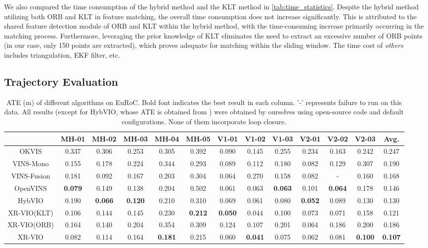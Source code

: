 We also compared the time consumption of the hybrid method and the KLT method in \cref{tab:time_statistics}. Despite the hybrid method utilizing both ORB and KLT in feature matching, the overall time consumption does not increase significantly. This is attributed to the shared feature detection module of ORB and KLT within the hybrid method, with the time-consuming increase primarily occurring in the matching process. Furthermore, leveraging the prior knowledge of KLT eliminates the need to extract an excessive number of ORB points (in our case, only 150 points are extracted), which proves adequate for matching within the sliding window. The time cost of \textit{others} includes triangulation, EKF filter, etc. 
\subsection{Trajectory Evaluation}
\begin{table*}[h]
    \caption{ATE (m)  of different algorithms on EuRoC.  Bold font indicates the best result in each column. '-' represents failure to run on this data. All results (except for HybVIO, whose ATE is obtained from \cite{hybvio}) were obtained by ourselves using open-source code and default configurations. None of them incorporate loop closure. }
    \centering
    \begin{tabular}{ccccccccccccc}
    \toprule
         & MH-01 & MH-02 & MH-03 & MH-04 & MH-05 & V1-01 & V1-02 & V1-03 & V2-01 & V2-02 & V2-03 & Avg. \\
         \midrule
         OKVIS      & 0.337 & 0.306 & 0.253 & 0.305 & 0.392 & 0.090 & 0.145 & 0.255 & 0.234 & 0.163 & 0.242 & 0.247 \\
         VINS-Mono  & 0.155 & 0.178 & 0.224 & 0.344 & 0.293 & 0.089 & 0.112 & 0.180 & 0.082 & 0.129 & 0.307 & 0.190 \\
         VINS-Fusion& 0.181 & 0.092 & 0.167 & 0.203 & 0.304 & 0.064 & 0.270 & 0.158 & 0.082 & -     & 0.160 & 0.168 \\
         OpenVINS   & \textbf{0.079} & 0.149 & 0.138 & 0.204 & 0.502 & 0.061 & 0.063 & \textbf{0.063} & 0.101 & \textbf{0.064} & 0.178 & 0.146 \\
         HybVIO     & 0.190 & \textbf{0.066} & \textbf{0.120} & 0.210 & 0.310 & 0.069 & 0.061 & 0.080 & \textbf{0.052} & 0.089 & 0.130 & 0.130 \\
         \midrule
         XR-VIO(KLT)& 0.106 & 0.144 & 0.145 & 0.230 & \textbf{0.212} & \textbf{0.050} & 0.044 & 0.100 & 0.073 & 0.071 & 0.158 & 0.121 \\
         XR-VIO(ORB)& 0.164 & 0.140 & 0.204 & 0.354 & 0.309 & 0.124 & 0.107 & 0.201 & 0.064 & 0.186 & 0.200 & 0.186 \\
         XR-VIO     & 0.082 & 0.114 & 0.164 & \textbf{0.181} & 0.215 & 0.060 & \textbf{0.041} & 0.075 & 0.062 & 0.081 & \textbf{0.100} & \textbf{0.107} \\
         \bottomrule
    \end{tabular}
    \label{tab:ATE_Compare}
\end{table*}
